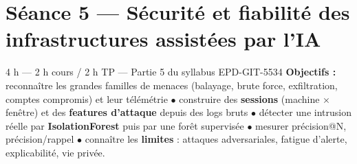 \section{Séance 5 --- Sécurité et fiabilité des infrastructures assistées par l'IA}
{4 h --- 2 h cours / 2 h TP --- Partie 5 du syllabus EPD-GIT-5534}
{\textbf{Objectifs :} reconnaître les grandes familles de menaces (balayage,
brute force, exfiltration, comptes compromis) et leur télémétrie $\bullet$
construire des \textbf{sessions} (machine $\times$ fenêtre) et des
\textbf{features d'attaque} depuis des logs bruts $\bullet$ détecter une
intrusion réelle par \textbf{IsolationForest} puis par une forêt supervisée
$\bullet$ mesurer précision@N, précision/rappel $\bullet$ connaître les
\textbf{limites} : attaques adversariales, fatigue d'alerte, explicabilité,
vie privée.}

